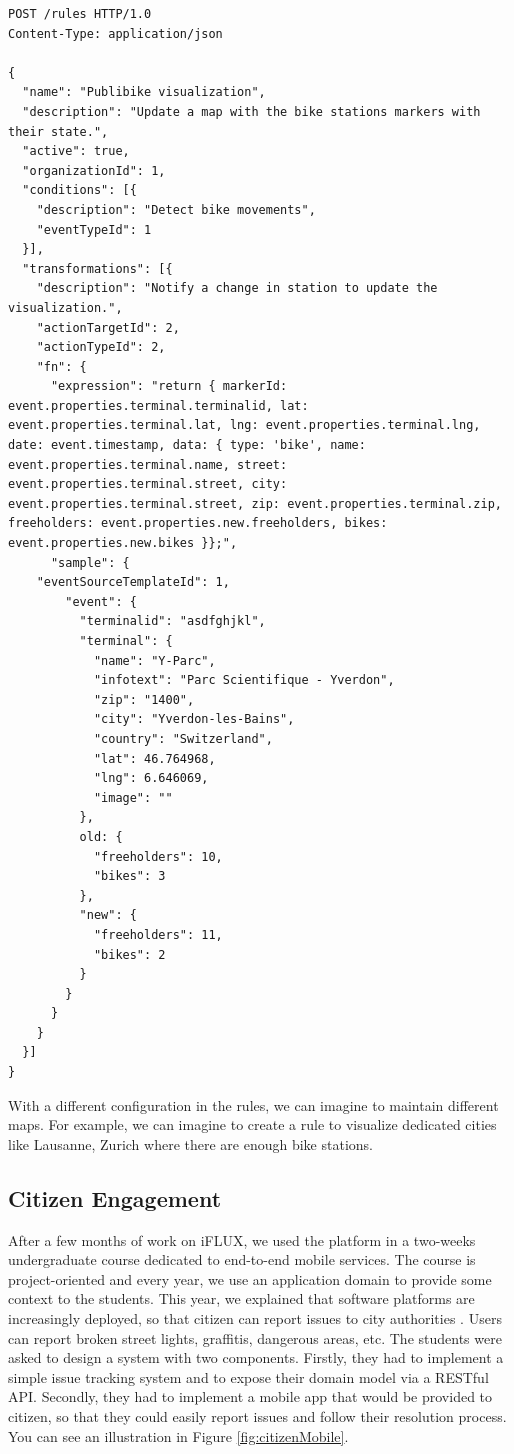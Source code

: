 \begin{lstlisting}
POST /rules HTTP/1.0
Content-Type: application/json

{
  "name": "Publibike visualization",
  "description": "Update a map with the bike stations markers with their state.",
  "active": true,
  "organizationId": 1,
  "conditions": [{
    "description": "Detect bike movements",
    "eventTypeId": 1
  }],
  "transformations": [{
    "description": "Notify a change in station to update the visualization.",
    "actionTargetId": 2,
    "actionTypeId": 2,
    "fn": {
      "expression": "return { markerId: event.properties.terminal.terminalid, lat: event.properties.terminal.lat, lng: event.properties.terminal.lng, date: event.timestamp, data: { type: 'bike', name: event.properties.terminal.name, street: event.properties.terminal.street, city: event.properties.terminal.street, zip: event.properties.terminal.zip, freeholders: event.properties.new.freeholders, bikes: event.properties.new.bikes }};",
      "sample": {
	"eventSourceTemplateId": 1,
        "event": {
          "terminalid": "asdfghjkl",
          "terminal": {
            "name": "Y-Parc",
            "infotext": "Parc Scientifique - Yverdon",
            "zip": "1400",
            "city": "Yverdon-les-Bains",
            "country": "Switzerland",
            "lat": 46.764968,
            "lng": 6.646069,
            "image": ""
          },
          old: {
            "freeholders": 10,
            "bikes": 3
          },
          "new": {
            "freeholders": 11,
            "bikes": 2
          }
        }
      }
    }
  }]
}
\end{lstlisting}

With a different configuration in the rules, we can imagine to maintain different maps. For example, we can imagine to create a rule to visualize dedicated cities like Lausanne, Zurich where there are enough bike stations.




\subsection{Citizen Engagement}

After a few months of work on iFLUX, we used the platform in a two-weeks undergraduate course dedicated to end-to-end mobile services. The course is project-oriented and every year, we use an application domain to provide some context to the students. This year, we explained that software platforms are increasingly deployed, so that citizen can report issues to city authorities \cite{patel2015guide,offenhuber2014infrastructure}. Users can report broken street lights, graffitis, dangerous areas, etc. The students were asked to design a system with two components. Firstly, they had to implement a simple issue tracking system and to expose their domain model via a RESTful API. Secondly, they had to implement a mobile app that would be provided to citizen, so that they could easily report issues and follow their resolution process. You can see an illustration in Figure \ref{fig:citizenMobile}.

